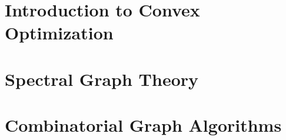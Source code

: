 \documentclass[12pt,a4paper,openany]{book}
\begin{document}
\newpage

\tableofcontents

\label{part:intro}


\part{Introduction to Convex Optimization}
\label{part:convex}




 \part{Spectral Graph Theory}
 \label{part:sg}
 
 
 
 
 
 




 \part{Combinatorial Graph Algorithms}
 \label{part:combinatorial}
 
 
 

%
%
%

%
%


% 
% 
\end{document}
